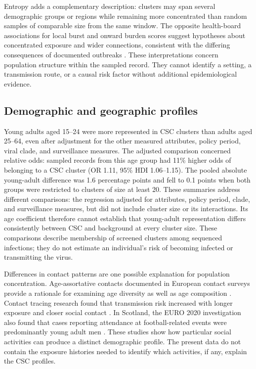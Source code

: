 Entropy adds a complementary description: clusters may span several demographic groups or regions while remaining more concentrated than random samples of comparable size from the same window. The opposite health-board associations for local burst and onward burden scores suggest hypotheses about concentrated exposure and wider connections, consistent with the differing consequences of documented outbreaks \citep{Lemieux2021}. These interpretations concern population structure within the sampled record. They cannot identify a setting, a transmission route, or a causal risk factor without additional epidemiological evidence.

\subsection{Demographic and geographic profiles}\label{sec:ch6_discussion_composition}

Young adults aged 15--24 were more represented in CSC clusters than adults aged 25--64, even after adjustment for the other measured attributes, policy period, viral clade, and surveillance measures. The adjusted comparison concerned relative odds: sampled records from this age group had 11\% higher odds of belonging to a CSC cluster (OR 1.11, 95\% HDI 1.06--1.15). The pooled absolute young-adult difference was 1.6 percentage points and fell to 0.1 points when both groups were restricted to clusters of size at least 20. These summaries address different comparisons: the regression adjusted for attributes, policy period, clade, and surveillance measures, but did not include cluster size or its interactions. Its age coefficient therefore cannot establish that young-adult representation differs consistently between CSC and background at every cluster size. These comparisons describe membership of screened clusters among sequenced infections; they do not estimate an individual's risk of becoming infected or transmitting the virus.

Differences in contact patterns are one possible explanation for population concentration. Age-assortative contacts documented in European contact surveys provide a rationale for examining age diversity as well as age composition \citep{Mossong2008}. Contact tracing research found that transmission risk increased with longer exposure and closer social contact \citep{Sun2021}. In Scotland, the EURO 2020 investigation also found that cases reporting attendance at football-related events were predominantly young adult men \citep{Marsh2021}. These studies show how particular social activities can produce a distinct demographic profile. The present data do not contain the exposure histories needed to identify which activities, if any, explain the CSC profiles.

